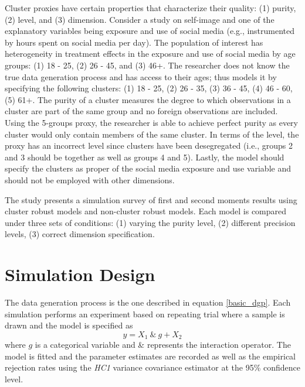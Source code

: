\documentclass{jbsc}
\begin{document}
Cluster proxies have certain properties that characterize their quality: (1) purity, (2) level, and (3) dimension. Consider a study on self-image and one of the explanatory variables being exposure and use of social media (e.g., instrumented by hours spent on social media per day). The population of interest has heterogeneity in treatment effects in the exposure and use of social media by age groups: (1) 18 - 25, (2) 26 - 45, and (3) 46+. The researcher does not know the true data generation process and has access to their ages; thus models it by specifying the following clusters: (1) 18 - 25, (2) 26 - 35, (3) 36 - 45, (4) 46 - 60, (5) 61+. The purity of a cluster measures the degree to which observations in a cluster are part of the same group and no foreign observations are included. Using the 5-groups proxy, the researcher is able to achieve perfect purity as every cluster would only contain members of the same cluster. In terms of the level, the proxy has an incorrect level since clusters have been desegregated (i.e., groups 2 and 3 should be together as well as groups 4 and 5). Lastly, the model should specify the clusters as proper of the social media exposure and use variable and  should not be employed with other dimensions.

The study presents a simulation survey of first and second moments results using cluster robust models and non-cluster robust models. Each model is compared under three sets of conditions: (1) varying the purity level, (2) different precision levels, (3) correct dimension specification.

\FloatBarrier
\section{Simulation Design}

The data generation process is the one described in equation \ref{basic_dgp}. Each simulation performs an experiment based on repeating trial where a sample is drawn and the model is specified as
\begin{equation}
y = X_{1}\ \&\ g + X_{2}
\end{equation}
where $g$ is a categorical variable and \& represents the interaction operator. The model is fitted and the parameter estimates are recorded as well as the empirical rejection rates using the \textit{HC1} variance covariance estimator at the 95\% confidence level.
\end{document}

